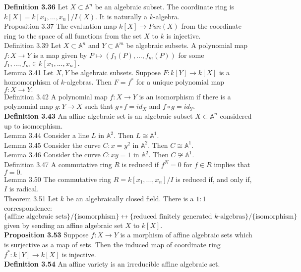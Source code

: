 \documentclass[8pt]{extarticle}
\begin{document}
\textbf{Definition 3.36} Let $X \subset \mathbb{A}^n$ be an algebraic subset. The coordinate ring is $k[X] = k[x_1,..., x_n]/I(X).$ It is naturally a $k$-algebra.\\
Proposition 3.37 The evaluation map $k[X]\rightarrow Fun(X)$ from the coordinate ring to the space of all functions from the set $X$ to $k$ is injective.\\
Definition 3.39 Let $X \subset \mathbb{A}^n$ and $Y \subset \mathbb{A}^m$ be algebraic subsets. A polynomial map $f : X \rightarrow Y$ is a map given by $P\mapsto(f_1(P),...,f_m(P))$ for some $f_1,...,f_m \in k[x_1,...,x_n].$\\
Lemma 3.41 Let $X, Y$ be algebraic subsets. Suppose $F : k[Y] \rightarrow k[X]$ is a homomorphism of $k$-algebras. Then $F=f^*$ for a unique  polynomial map $f:X\rightarrow Y.$\\
Definition 3.42 A polynomial map $f: X \rightarrow Y$ is an isomorphism if there is a polynomial map $g: Y \rightarrow X$
such that $g\circ f=id_X$ and $f\circ g=id_Y.$\\
\textbf{Definition 3.43} An affine algebraic set is an algebraic subset $X \subset \mathbb{A}^n$ considered up to isomorphism.\\
Lemma 3.44 Consider a line $L$ in $\mathbb{A}^2.$ Then $L \cong \mathbb{A}^1.$\\
Lemma 3.45 Consider the curve $C : x = y^2$ in $\mathbb{A}^2.$ Then $C \cong \mathbb{A}^1.$\\
Lemma 3.46 Consider the curve $C : xy = 1$ in $\mathbb{A}^2.$ Then $C \not\cong \mathbb{A}^1.$\\
Definition 3.47 A commutative ring $R$ is reduced if $f^N = 0$ for $f \in R$ implies that $f = 0.$\\
Lemma 3.50 The commutative ring $R = k[x_1,..., x_n]/I$ is reduced if, and only if, $I$ is radical.\\
Theorem 3.51 Let $k$ be an algebraically closed field. There is a $1:1$ correspondence: \\$\{\text{affine algebraic sets}\}/\{\text{isomorphism}\}\leftrightarrow \{\text{reduced finitely generated $k$-algebras}\}/\{\text{isomorphism}\}$ given by sending an affine algebraic set $X$ to $k[X].$\\
\textbf{Proposition 3.53} Suppose $f:X\rightarrow Y$ is a morphism of affine algebraic sets which is surjective as a map of sets. Then the induced map of coordinate ring $f^*:k[Y]\rightarrow k[X]$ is injective.\\
\textbf{Definition 3.54} An affine variety is an irreducible affine algebraic set.\\
\end{document}
